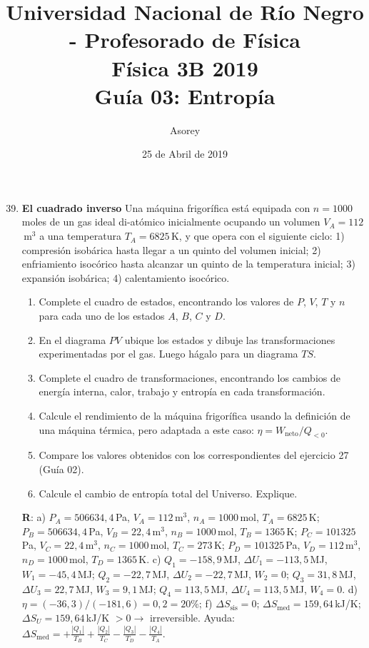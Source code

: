 \documentclass[a4paper,12pt]{article}
\begin{document}
\title{
{\normalsize{Universidad Nacional de Río Negro - Profesorado de Física}}\\
Física 3B 2019 \\ Guía 03: Entropía
}
\author{Asorey}
\date{25 de Abril de 2019}
\maketitle

\begin{enumerate}
	\setcounter{enumi}{38}     

    \item {\bf{El cuadrado inverso}}
		Una máquina frigorífica está equipada con $n=1000$\,moles de un gas
		ideal di-atómico inicialmente ocupando un volumen $V_A=112$\,m$^3$ a
		una temperatura $T_A=6825$\,K, y que opera con el siguiente ciclo: 1)
		compresión isobárica hasta llegar a un quinto del volumen inicial; 2)
		enfriamiento isocórico hasta alcanzar un quinto de la temperatura
		inicial; 3) expansión isobárica; 4) calentamiento isocórico.
		\begin{enumerate}
            \item Complete el cuadro de estados, encontrando los valores de
                $P$, $V$, $T$ y $n$ para cada uno de los estados $A$, $B$, $C$
                y $D$.
            \item En el diagrama $PV$ ubique los estados y dibuje las
				transformaciones experimentadas por el gas. Luego hágalo para
				un diagrama $TS$.
            \item Complete el cuadro de transformaciones, encontrando los
                cambios de energía interna, calor, trabajo y entropía en cada
                transformación.
			\item Calcule el rendimiento de la máquina frigorífica usando la
				definición de una máquina térmica, pero adaptada a este caso:
				$\eta=W_{\mathrm{neto}}/Q_{<0}$.
			\item Compare los valores obtenidos con los correspondientes del
				ejercicio 27 (Guía 02).
			\item Calcule el cambio de entropía total del Universo. Explique.
        \end{enumerate}
        {\bf{R}}: a) 
		$P_A=506634,4$\,Pa, $V_A=112$\,m$^3$, $n_A=1000$\,mol, $T_A=6825$\,K; 
		$P_B=506634,4$\,Pa, $V_B=22,4$\,m$^3$, $n_B=1000$\,mol, $T_B=1365$\,K; 
		$P_C=101325$\,Pa, $V_C=22,4$\,m$^3$, $n_C=1000$\,mol, $T_C=273$\,K; 
		$P_D=101325$\,Pa, $V_D=112$\,m$^3$, $n_D=1000$\,mol, $T_D=1365$\,K. 
		c) 
		$Q_1=-158,9$\,MJ, $\Delta U_1=-113,5$\,MJ, $W_1=-45,4$\,MJ;
		$Q_2=-22,7$\,MJ, $\Delta U_2=-22,7$\,MJ, $W_2=0$;
		$Q_3=31,8$\,MJ, $\Delta U_3=22,7$\,MJ, $W_3=9,1$\,MJ; 
        $Q_4=113,5$\,MJ, $\Delta U_4=113,5$\,MJ, $W_4=0$. 
		d) $\eta=(-36,3)/(-181,6) = 0,2 = 20\%$; 
		f) $\Delta S_{\mathrm{sis}} = 0$; $\Delta
		S_{\mathrm{med}}=159,64$\,kJ/K; $\Delta S_U=159,64$\,kJ/K $>0 \to$
		irreversible. Ayuda: $\Delta S_{\mathrm{med}} = +\frac{|Q_1|}{T_B} +
		\frac{|Q_2|}{T_C} - \frac{|Q_3|}{T_D} - \frac{|Q_4|}{T_A}$.


\end{enumerate}
\end{document}

